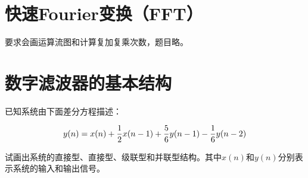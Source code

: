 \documentclass[cn, hazy, blue, normal, 12pt]{elegantnote}
\begin{document}
\section{快速Fourier变换（FFT）}

要求会画运算流图和计算复加复乘次数，题目略。

\section{数字滤波器的基本结构}

\begin{exercise}

已知系统由下面差分方程描述：

\begin{equation}
\notag
    y(n)=x(n)+\frac{1}{2}x(n-1)+\frac{5}{6}y(n-1)-\frac{1}{6}y(n-2)
\end{equation}

试画出系统的直接\uppercase\expandafter{}型、直接\uppercase\expandafter{}型、级联型和并联型结构。其中$x(n)$和$y(n)$分别表示系统的输入和输出信号。

\end{exercise}
\end{document}
